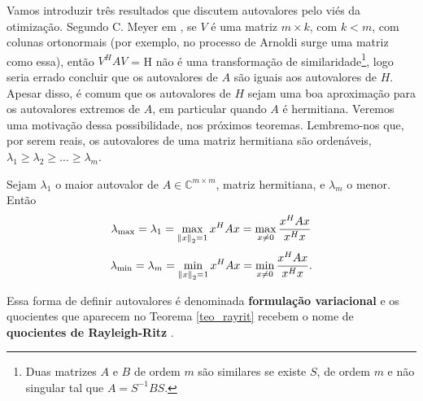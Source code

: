  Vamos introduzir três resultados que  discutem autovalores pelo viés da otimização.
Segundo C. Meyer em \cite[pág. 651]{Meyer00Matrix},
se $V$ é uma matriz $m\times k$, com $k<m$, com colunas ortonormais (por exemplo, no processo de Arnoldi surge uma matriz como essa), então $V^HAV$ = H não é uma transformação de similaridade\footnote{Duas matrizes $A$ e $B$ de ordem $m$ são similares se existe $S$, de ordem $m$ e não singular tal que $A=S^{-1}BS$.}, logo seria errado concluir que os autovalores de $A$ são iguais aos autovalores de $H$. Apesar disso, é comum que os autovalores de $H$ sejam uma boa aproximação para os autovalores extremos de $A$, em particular quando $A$ é hermitiana.   Veremos uma motivação dessa possibilidade, nos próximos teoremas. Lembremo-nos que, por serem reais, os autovalores de uma matriz hermitiana são ordenáveis, $\lambda_1\geqslant\lambda_2\geqslant\ldots\geqslant\lambda_m$.
 \begin{teore}\label{teo_rayrit}
 Sejam $\lambda_1$ o maior autovalor de $A\in\mathbb{C}^{m\times m}$, matriz hermitiana, e  $\lambda_m$ o menor. Então
\begin{equation}\label{eq_rayritmax}
    \lambda_{\max}=\lambda_1=\max_{{\Vert x\Vert}_2=1}x^HAx=\max_{x\ne 0}\frac{x^HAx}{x^Hx}
\end{equation}
\begin{equation}\label{eq_rayritmin}
    \lambda_{\min}=\lambda_m=\min_{{\Vert x\Vert}_2=1}x^HAx=\min_{x\ne 0}\frac{x^HAx}{x^Hx}.
\end{equation}
 \end{teore}

\begin{obs}\label{obs_formvaria}
Essa forma de definir autovalores é denominada \textbf{formulação variacional} e os quocientes que aparecem no Teorema \ref{teo_rayrit} recebem o nome de \textbf{quocientes de Rayleigh-Ritz} .
\end{obs}


